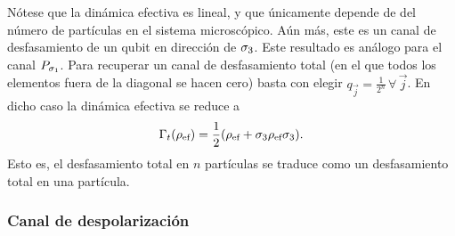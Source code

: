 Nótese que la dinámica efectiva es lineal, y que únicamente depende de del número de partículas en el sistema microscópico. Aún más, este es un canal de desfasamiento de un qubit en dirección de $\sigma_{3}$. Este resultado es análogo para el canal $P_{\sigma_{1}}$. Para recuperar un canal de desfasamiento total (en el que todos los elementos fuera de la diagonal se hacen cero) basta con elegir $q_{\vec{j}}=\frac{1}{2^{n}}\,\forall\,\vec{j}$. En dicho caso la dinámica efectiva se reduce a
\begin{equation}\label{eq:EffectiveDephasing}
    \Gamma_{t}(\rho_{\text{ef}})=\frac{1}{2}(\rho_{\text{ef}}+\sigma_{3}\rho_{\text{ef}}\sigma_{3}).
\end{equation}
Esto es, el desfasamiento total en $n$ partículas se traduce como un desfasamiento total en una partícula.


\subsubsection{Canal de despolarización}

